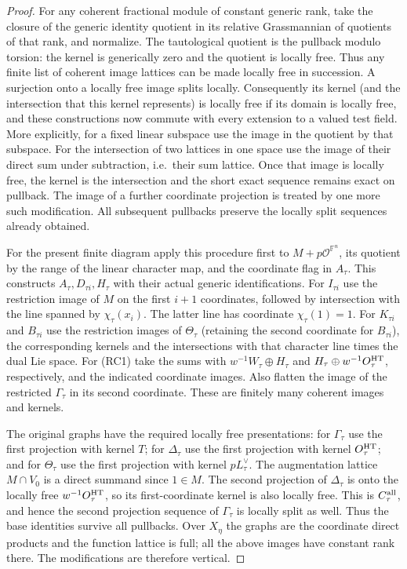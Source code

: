 \begin{proof}
For any coherent fractional module of constant generic rank,
take the closure of the generic identity quotient in its relative
Grassmannian of quotients of that rank, and normalize.
The tautological quotient is the pullback modulo torsion:
the kernel is generically zero and the quotient is locally free.
Thus any finite list of coherent image lattices can be made
locally free in succession. A surjection onto a locally free
image splits locally. Consequently its kernel (and the intersection
that this kernel represents) is locally free if its domain is
locally free, and these constructions now commute with every
extension to a valued test field. More explicitly, for a fixed
linear subspace use the image in the quotient by that subspace.
For the intersection of two lattices in one space use the image
of their direct sum under subtraction, i.e.\ their sum lattice.
Once that image is locally free, the kernel is the intersection
and the short exact sequence remains exact on pullback.
The image of a further coordinate projection is treated by
one more such modification. All subsequent pullbacks preserve
the locally split sequences already obtained.

For the present finite diagram apply this procedure first to
\(M+p\mathcal O^{\mathbb F^n}\), its quotient by the range of
the linear character map, and the coordinate flag in \(A_\tau\).
This constructs \(A_\tau,D_{\tau i},H_\tau\) with their actual
generic identifications. For \(I_{\tau i}\) use the restriction
image of \(M\) on the first \(i+1\) coordinates, followed by
intersection with the line spanned by \(\chi_\tau(x_i)\).
The latter line has coordinate \(\chi_\tau(1)=1\).
For \(K_{\tau i}\) and \(B_{\tau i}\) use the restriction
images of \(\Theta_\tau\) (retaining the second coordinate for
\(B_{\tau i}\)), the corresponding kernels and the intersections
with that character line times the dual Lie space.
For (RC1) take the sums with \(w^{-1}W_\tau\oplus H_\tau\)
and \(H_\tau\oplus w^{-1}O_\tau^{\rm HT}\), respectively, and
the indicated coordinate images. Also flatten the image of
the restricted \(\Gamma_\tau\) in its second coordinate.
These are finitely many coherent images and kernels.

The original graphs have the required locally free
presentations: for \(\Gamma_\tau\) use the first projection
with kernel \(T\); for \(\Delta_\tau\) use the first projection
with kernel \(O_\tau^{\rm HT}\); and for \(\Theta_\tau\) use the
first projection with kernel \(pL_\tau^\vee\). The augmentation
lattice \(M\cap V_0\) is a direct summand since \(1\in M\).
The second projection of \(\Delta_\tau\) is onto the locally
free \(w^{-1}O_\tau^{\rm HT}\), so its first-coordinate kernel
is also locally free. This is \(C_\tau^{\rm all}\), and hence
the second projection sequence of \(\Gamma_\tau\) is locally
split as well. Thus the base identities survive all pullbacks.
Over \(X_\eta\) the graphs are the coordinate direct products
and the function lattice is full; all the above images have
constant rank there. The modifications are therefore vertical.


\end{proof}
